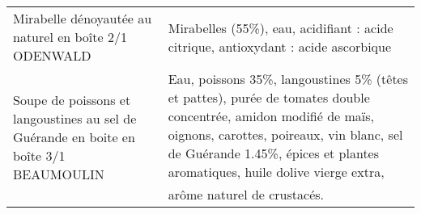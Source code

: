 \begin{longtable}{p{5cm}p{10cm}}
                                                    Mirabelle dénoyautée au naturel en boîte 2/1 ODENWALD &                                                                                                                                                                                                                                                                                                                                                                                                                                                                                                                                                                                                                                                                                                                                                                                                                                                                                                                                                       Mirabelles (55\%), eau, acidifiant : acide citrique, antioxydant : acide ascorbique \\
                    Soupe de poissons et langoustines au sel de Guérande en boite en boîte 3/1 BEAUMOULIN &                                                                                                                                                                                                                                                                                                                                                                                                                                                                                                                                                                                                                                                                                                                                                                  Eau, poissons 35\%, langoustines 5\% (têtes et pattes), purée de tomates double concentrée, amidon modifié de maïs, oignons, carottes, poireaux, vin blanc, sel de Guérande 1.45\%, épices et plantes aromatiques, huile dolive vierge extra, arôme naturel de crustacés. \\

\end{longtable}
